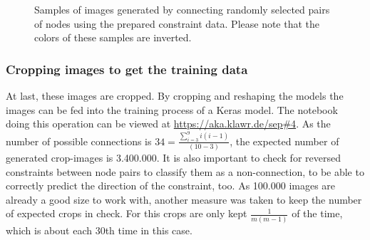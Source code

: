 \begin{figure}
\begin{subfigure}[b]{0.19\textwidth}
    \end{subfigure}
    \begin{subfigure}[b]{0.19\textwidth}
    \end{subfigure}
    \caption[Randomly connected nodes using constraint data]{Samples of images generated by connecting randomly selected pairs of nodes using the prepared constraint data. Please note that the colors of these samples are inverted.}
    \label{fig:constraint_data_step2}
\end{figure}

\subsubsection{Cropping images to get the training data}
\label{ch:cropping_images}

At last, these images are cropped.
By cropping and reshaping the models the images can be fed into the training process of a Keras model.
The notebook doing this operation can be viewed at \url{https://aka.klawr.de/sep\#4}.
As the number of possible connections is $34 = \frac{\sum_{i=3}^{9}i(i-1)}{(10-3)}$, the expected number of generated crop-images is 3.400.000.
It is also important to check for reversed constraints between node pairs to classify them as a non-connection, to be able to correctly predict the direction of the constraint, too.
As 100.000 images are already a good size to work with, another measure was taken to keep the number of expected crops in check.
For this crops are only kept $\frac{1}{m(m-1)}$ of the time, which is about each 30th time in this case.

